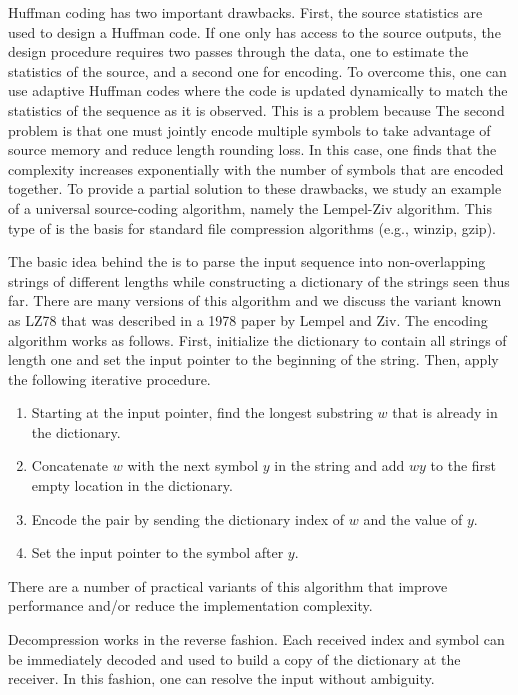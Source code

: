 Huffman coding has two important drawbacks.
First, the source statistics are used to design a Huffman code.
If one only has access to the source outputs, the design procedure requires two passes through the data, one to estimate the statistics of the source, and a second one for encoding.
To overcome this, one can use adaptive Huffman codes where the code is updated dynamically to match the statistics of the sequence as it is observed.
This is a problem because
The second problem is that one must jointly encode multiple symbols to take advantage of source memory and reduce length rounding loss.
In this case, one finds that the complexity increases exponentially with the number of symbols that are encoded together.
To provide a partial solution to these drawbacks, we study an example of a universal source-coding algorithm, namely the Lempel-Ziv algorithm.
This type of  is the basis for standard file compression algorithms (e.g., winzip, gzip).

The basic idea behind the  is to parse the input sequence into non-overlapping strings of different lengths while constructing a dictionary of the strings seen thus far.
There are many versions of this algorithm and we discuss the variant known as LZ78 that was described in a 1978 paper by Lempel and Ziv.
The encoding algorithm works as follows.
First, initialize the dictionary to contain all strings of length one and set the input pointer to the beginning of the string.
Then, apply the following iterative procedure.
\begin{enumerate}
\item Starting at the input pointer, find the longest substring $w$ that is already in the dictionary.
\item Concatenate $w$ with the next symbol $y$ in the string and add $wy$ to the first empty location in the dictionary.
\item Encode the pair by sending the dictionary index of $w$ and the value of $y$.
\item Set the input pointer to the symbol after $y$.
\end{enumerate}
There are a number of practical variants of this algorithm that improve performance and/or reduce the implementation complexity.

Decompression works in the reverse fashion.
Each received index and symbol can be immediately decoded and used to build a copy of the dictionary at the receiver.
In this fashion, one can resolve the input without ambiguity.

